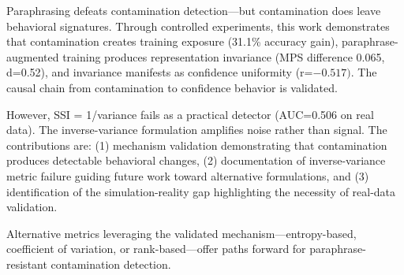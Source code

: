 
Paraphrasing defeats contamination detection---but contamination does leave behavioral signatures. Through controlled experiments, this work demonstrates that contamination creates training exposure (31.1\% accuracy gain), paraphrase-augmented training produces representation invariance (MPS difference 0.065, d=0.52), and invariance manifests as confidence uniformity (r=$-0.517)$. The causal chain from contamination to confidence behavior is validated.

However, SSI = 1/variance fails as a practical detector (AUC=0.506 on real data). The inverse-variance formulation amplifies noise rather than signal. The contributions are: (1) mechanism validation demonstrating that contamination produces detectable behavioral changes, (2) documentation of inverse-variance metric failure guiding future work toward alternative formulations, and (3) identification of the simulation-reality gap highlighting the necessity of real-data validation.

Alternative metrics leveraging the validated mechanism---entropy-based, coefficient of variation, or rank-based---offer paths forward for paraphrase-resistant contamination detection.
